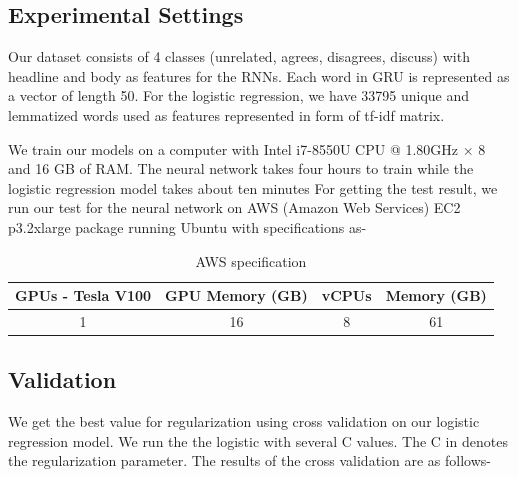 \documentclass[11.5pt]{article}
\begin{document}
\subsection{Experimental Settings}

Our dataset consists of 4 classes (unrelated, agrees, disagrees, discuss) with headline and body as features for the RNNs. Each word in GRU is represented as a vector of length 50.
For the logistic regression, we have 33795 unique and lemmatized words used as features represented in form of tf-idf matrix.

We train our models on a computer with Intel i7-8550U CPU @ 1.80GHz × 8 and 16 GB of RAM. The neural network takes four hours to train while the logistic regression model takes about ten minutes
For getting the test result, we run our test for the neural network on AWS (Amazon Web Services) EC2 p3.2xlarge package running Ubuntu with specifications as-

\begin{table}[h]
  \centering
  \begin{tabular} 
    {|c|c|c|c|}
    \hline
    GPUs - Tesla V100 & GPU Memory (GB) & vCPUs & Memory (GB) \\
    \hline
    1 & 16 & 8 & 61 \\
    \hline
  \end{tabular}
  \caption{AWS specification}
\end{table}

\subsection{Validation}

We get the best value for regularization using cross validation on our logistic regression model. We run the the logistic with several C values. The C in denotes the regularization parameter. The results of the cross validation are as follows-
\end{document}
